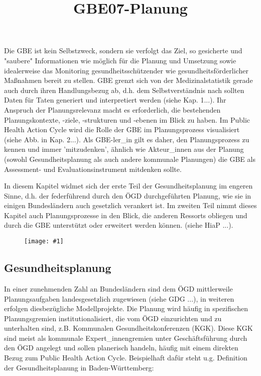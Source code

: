 \documentclass{article}
\newlength{\imgwidth}
\newcommand\scaledgraphics[2]{%
                
\settowidth{\imgwidth}{\texttt{[image: \#1]}}%
                
\setlength{\imgwidth}{\minof{\imgwidth}{#2\textwidth}}%
                
\texttt{[image: \#1]}%
                
}
\begin{document}
\title{GBE07-Planung}

\maketitle


Die GBE ist kein Selbstzweck, sondern sie verfolgt das Ziel, so gesicherte und "saubere" Informationen wie möglich für die Planung und Umsetzung sowie idealerweise das Monitoring gesundheitsschützender wie gesundheitsförderlicher Maßnahmen bereit zu stellen. GBE grenzt sich von der Medizinalstatistik gerade auch durch ihren Handlungsbezug ab, d.h. dem Selbstverständnis nach sollten Daten für Taten generiert und interpretiert werden (siehe Kap. 1...). Ihr Anspruch der Planungsrelevanz macht es erforderlich, die bestehenden Planungskontexte, -ziele, -strukturen und -ebenen im Blick zu haben. Im Public Health Action Cycle wird die Rolle der GBE im Planungsprozess visualisiert (siehe Abb. in Kap. 2...). Als GBE-ler\_in gilt es daher, den Planungsprozess zu kennen und immer 'mitzudenken', ähnlich wie Akteur\_innen aus der Planung (sowohl Gesundheitsplanung als auch andere kommunale Planungen) die GBE als Assessment- und Evaluationsinstrument mitdenken sollte.


In diesem Kapitel widmet sich der erste Teil der Gesundheitsplanung im engeren Sinne, d.h. der federführend durch den ÖGD durchgeführten Planung, wie sie in einigen Bundesländern auch gesetzlich verankert ist. Im zweiten Teil nimmt  dieses Kapitel auch Planungsprozesse in den Blick, die anderen Ressorts obliegen und durch die GBE unterstützt oder erweitert werden können. (siehe HiaP ...).

\begin{figure}
\scaledgraphics{a8184739-380b-436d-8469-67dcbd9664d5.png}{1}
\label{F5832671}
\end{figure}


\subsection{Gesundheitsplanung}\label{H1599355}



In einer zunehmenden Zahl an Bundesländern sind dem ÖGD mittlerweile Planungsaufgaben landesgesetzlich zugewiesen (siehe GDG ...), in weiteren erfolgen diesbezügliche Modellprojekte. Die Planung wird häufig in spezifischen Planungsgremien institutionalisiert, die vom ÖGD einzurichten und zu unterhalten sind, z.B. Kommunalen Gesundheitskonferenzen (KGK). Diese KGK sind meist als kommunale Expert\_innengremien unter Geschäftsführung durch den ÖGD angelegt und sollen planerisch handeln, häufig mit einem direkten Bezug zum Public Health Action Cycle\autocite{Hollederer2014}. Beispielhaft dafür steht u.g. Definition der Gesundheitsplanung in Baden-Württemberg:
\end{document}
